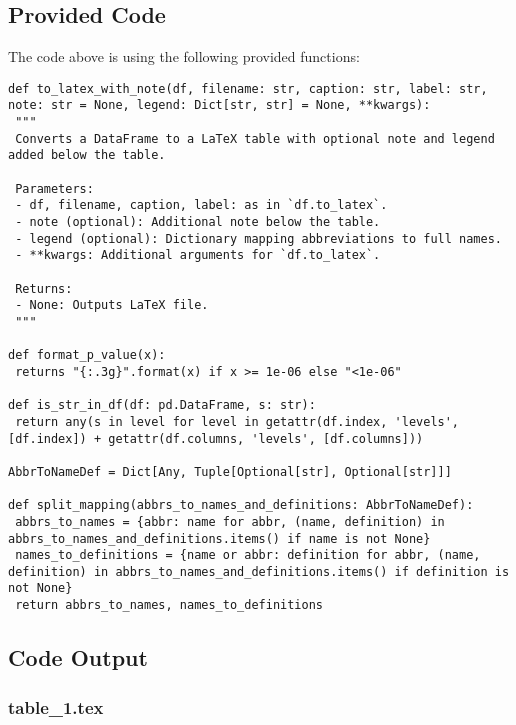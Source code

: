 \documentclass[11pt]{article}
\begin{document}
\subsection{Provided Code}
The code above is using the following provided functions:

\begin{verbatim}
def to_latex_with_note(df, filename: str, caption: str, label: str, note: str = None, legend: Dict[str, str] = None, **kwargs):
 """
 Converts a DataFrame to a LaTeX table with optional note and legend added below the table.

 Parameters:
 - df, filename, caption, label: as in `df.to_latex`.
 - note (optional): Additional note below the table.
 - legend (optional): Dictionary mapping abbreviations to full names.
 - **kwargs: Additional arguments for `df.to_latex`.

 Returns:
 - None: Outputs LaTeX file.
 """

def format_p_value(x):
 returns "{:.3g}".format(x) if x >= 1e-06 else "<1e-06"

def is_str_in_df(df: pd.DataFrame, s: str):
 return any(s in level for level in getattr(df.index, 'levels', [df.index]) + getattr(df.columns, 'levels', [df.columns]))

AbbrToNameDef = Dict[Any, Tuple[Optional[str], Optional[str]]]

def split_mapping(abbrs_to_names_and_definitions: AbbrToNameDef):
 abbrs_to_names = {abbr: name for abbr, (name, definition) in abbrs_to_names_and_definitions.items() if name is not None}
 names_to_definitions = {name or abbr: definition for abbr, (name, definition) in abbrs_to_names_and_definitions.items() if definition is not None}
 return abbrs_to_names, names_to_definitions

\end{verbatim}



\subsection{Code Output}

\subsubsection*{table\_1.tex}
\end{document}
